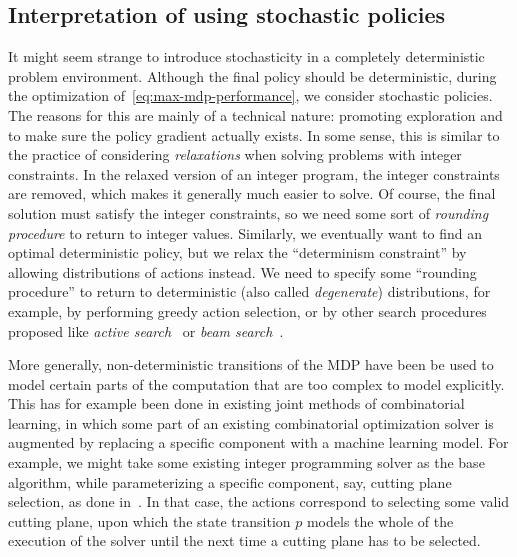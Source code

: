 \documentclass{report}
\theoremstyle{definition}
\theoremstyle{plain}
\begin{document}
\subsection{Interpretation of using stochastic policies}

It might seem strange to introduce stochasticity
in a completely deterministic problem environment.
%
Although the final policy should be deterministic, during the optimization
of~\eqref{eq:max-mdp-performance}, we consider stochastic policies.
%
The reasons for this are mainly of a technical nature: promoting exploration and
to make sure the policy gradient actually exists.
%
In some sense, this is similar to the practice of considering \emph{relaxations}
when solving problems with integer constraints. In the relaxed version of an
integer program, the integer constraints are removed, which makes it generally
much easier to solve. Of course, the final solution must satisfy the integer
constraints, so we need some sort of \emph{rounding procedure} to return to
integer values.
%
Similarly, we eventually want to find an optimal deterministic policy, but we
relax the ``determinism constraint'' by allowing distributions of actions
instead.
%
We need to specify some ``rounding procedure'' to return to deterministic (also
called \emph{degenerate}) distributions, for example, by performing greedy
action selection, or by other search procedures proposed like \emph{active
  search}~\cite{belloNeuralCombinatorialOptimization2017} or \emph{beam
  search}~\cite{koolLearningOptimizationCombinatorial2022}.

More generally, non-deterministic transitions of the MDP have been be used to
model certain parts of the computation that are too complex to model explicitly.
%
This has for example been done in existing joint methods of combinatorial
learning, in which some part of an existing combinatorial optimization solver is
augmented by replacing a specific component with a machine learning model.
%
For example, we might take some existing integer programming solver as the base
algorithm, while parameterizing a specific component, say, cutting plane
selection, as done in~\cite{tangReinforcementLearningInteger2020}.
%
In that case, the actions correspond to selecting some valid
cutting plane, upon which the state transition $p$ models the whole of the
execution of the solver until the next time a cutting plane has to be selected.



\end{document}
